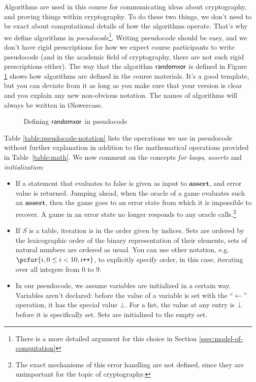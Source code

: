 Algorithms are used in this course for communicating ideas about cryptography, and proving things within cryptography. To do these two things, we don't need to be exact about computational details of how the algorithms operate. That's why we define algorithms in \emph{pseudocode}\footnote{There is a more detailed argument for this choice in Section \ref{ssec:model-of-computation}}. Writing pseudocode should be easy, and we don't have rigid prescriptions for how we expect course participants to write pseudocode (and in the academic field of cryptography, there are not such rigid prescriptions either). The way that the algorithm $\mathsf{randomxor}$ is defined in Figure \ref{example-pseudocode} shows how algorithms are defined in the course materials. It's a good template, but you can deviate from it as long as you make sure that your version is clear and you explain any new non-obvious notation. The names of algorithms will always be written in \O{lowercase}.

\begin{figure}
\begin{center}
\end{center}
\caption{Defining $\mathsf{randomxor}$ in pseudocode}\label{example-pseudocode}
\end{figure}


Table \ref{table:pseudocode-notation} lists the operations we use in pseudocode without further explanation in addition to the mathematical operations provided in Table~\ref{table:math}. We now comment on the concepts \emph{for loops}, \emph{asserts} and \emph{initialization}:
\begin{itemize}
\item If a statement that evaluates to false is given as input to $\mathbf{assert}$, and error value is returned. Jumping ahead, when the oracle of a game evaluates such an $\mathbf{assert}$, then the game goes to an error state from which it is impossible to recover. A game in an error state no longer responds to any oracle calls.\footnote{The exact mechanisms of this error handling are not defined, since they are unimportant for the topic of cryptography.}
\item If $S$ is a table, iteration is in the order given by indices. Sets are ordered by the lexicographic order of the binary representation of their elements, sets of natural numbers are ordered as usual. You can use other notation, e.g. $\pcfor \{i, 0\leq i<10, i\texttt{++}\}$, to explicitly specify order, in this case, iterating over all integers from $0$ to $9$.
\item  In our pseudocode, we assume variables are initialized in a certain way. Variables aren't declared: before the value of a variable is set with the ``$\gets$'' operation, it has the special value $\bot$. For a list, the value at any entry is $\bot$ before it is specifically set. Sets are initialized to the empty set.
\end{itemize}


